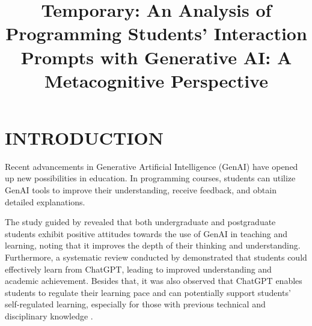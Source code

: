 \documentclass[a4paper,twoside]{article}
\begin{document}
\title{
  Temporary: An Analysis of Programming Students’ Interaction Prompts with
  Generative AI: A Metacognitive Perspective
}

\author{
}



\twocolumn\maketitle\normalsize\setcounter{footnote}{0}

\section{\uppercase{Introduction}}
\label{sec:introduction}

Recent advancements in Generative Artificial Intelligence (GenAI) have opened up
new possibilities in education. In programming courses, students can utilize
GenAI tools to improve their understanding, receive feedback, and obtain
detailed explanations.

The study guided by \cite{chan23} revealed that both undergraduate and
postgraduate students exhibit positive attitudes towards the use of GenAI in
teaching and learning, noting that it improves the depth of their thinking and
understanding. Furthermore, a systematic review conducted by \cite{Lo24}
demonstrated that students could effectively learn from ChatGPT, leading to
improved understanding and academic achievement. Besides that, it was also
observed that ChatGPT enables students to regulate their learning pace
\citep{Baha24} and can potentially support students’ self-regulated learning,
especially for those with previous technical and disciplinary knowledge
\citep{Xia23}.
\end{document}
